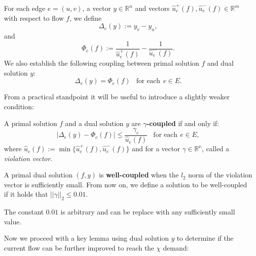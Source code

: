 \begin{definition}
For each edge $e=(u,v)$, a vector $y\in\mathbb{R}^n$ and vectors $\hat{u}_e^+(f),\hat{u}_e^-(f)\in\mathbb{R}^m$ with respect to flow $f$, we define
\begin{equation}
\label{delta_y}
\Delta_e(y) := y_v - y_u,
\end{equation}
and
\begin{equation}
\label{phi_f}
\Phi_e(f) := \frac{1}{\hat u_e^+(f)}-\frac{1}{\hat u_e^-(f)}.
\end{equation}
We also establish the following coupling between primal solution $f$ and dual solution $y$:
\[ \Delta_e(y) = \Phi_e(f) \hspace{10pt} \text{for each} \hspace{5pt} e \in E. \]
\end{definition}

From a practical standpoint it will be useful to introduce a slightly weaker condition:
\begin{definition}
A primal solution $f$ and a dual solution $y$ are \textbf{$\gamma$-coupled} if and only if:
\begin{equation}
\label{gamma_couple}
|\Delta_e(y)-\Phi_e(f)| \le \frac{\gamma_e}{\hat u_e(f)} \hspace{10pt} \text{for each} \hspace{5pt} e \in E,
\end{equation}
where $\hat u_e(f) := \min\{\hat u_e^+(f), \hat u_e^-(f)\}$ and for a vector $\gamma \in \mathbb{R^n}$, called a \textit{violation vector}.
\end{definition}

\begin{definition}
A primal dual solution $(f, y)$ is \textbf{well-coupled} when the $l_2$ norm of the violation vector is sufficiently small. From now on, we define a solution to be well-coupled if it holds that $||\gamma||_2 \le 0.01$.
\end{definition}
The constant $0.01$ is arbitrary and can be replace with any sufficiently small value.

Now we proceed with a key lemma using dual solution $y$ to determine if the current flow can be further improved to reach the $\chi$ demand:

